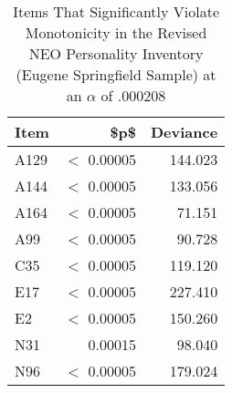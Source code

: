 \begin{table}[ht]
\centering
\caption{Items That Significantly Violate Monotonicity in the Revised NEO Personality Inventory (Eugene Springfield Sample) at an $\alpha$ of .000208} 
\label{tab:neo_pi_r}
\begin{tabular}{lrr}
  \toprule
Item & \$p\$ & Deviance \\ 
  \midrule
A129 & $<$ 0.00005 & 144.023 \\ 
  A144 & $<$ 0.00005 & 133.056 \\ 
  A164 & $<$ 0.00005 & 71.151 \\ 
  A99 & $<$ 0.00005 & 90.728 \\ 
  C35 & $<$ 0.00005 & 119.120 \\ 
  E17 & $<$ 0.00005 & 227.410 \\ 
  E2 & $<$ 0.00005 & 150.260 \\ 
  N31 & 0.00015 & 98.040 \\ 
  N96 & $<$ 0.00005 & 179.024 \\ 
   \bottomrule
\end{tabular}
\end{table}
